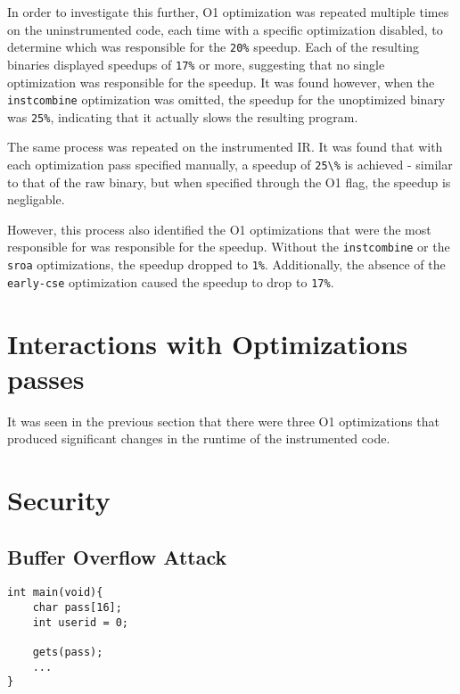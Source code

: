 In order to investigate this further, O1 optimization was repeated multiple times on the uninstrumented code, each time with a specific optimization disabled, to determine which was responsible for the \verb!20%! speedup.
Each of the resulting binaries displayed speedups of \verb!17%! or more, suggesting that no single optimization was responsible for the speedup.
It was found however, when the \verb!instcombine! optimization was omitted, the speedup for the unoptimized binary was \verb!25%!, indicating that it actually slows the resulting program.

The same process was repeated on the instrumented IR.
It was found that with each optimization pass specified manually, a speedup of \verb!25\%! is achieved - similar to that of the raw binary, but when specified through the O1 flag, the speedup is negligable.

However, this process also identified the O1 optimizations that were the most responsible for was responsible for the speedup.
Without the \verb!instcombine! or the \verb!sroa! optimizations, the speedup dropped to \verb!1%!.
Additionally, the absence of the \verb!early-cse! optimization caused the speedup to drop to \verb!17%!.

\section{Interactions with Optimizations passes}

It was seen in the previous section that there were three O1 optimizations that produced significant changes in the runtime of the instrumented code.

\section{Security}

\subsection{Buffer Overflow Attack}

\begin{verbatim}
int main(void){
    char pass[16];
    int userid = 0;

    gets(pass);
    ...
}
\end{verbatim}

